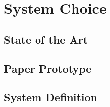 \chapter{System Choice}


\section{State of the Art}
\label{StateOfTheArt}


\section{Paper Prototype}


\section{System Definition}\label{systemDefinition}


